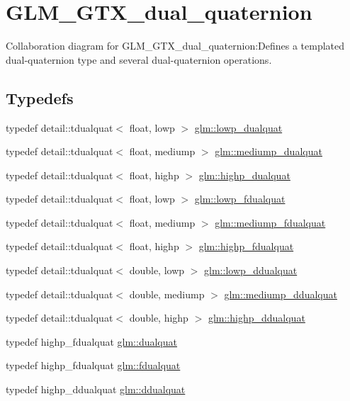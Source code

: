 \hypertarget{group__gtc__dual__quaternion}{
\section{GLM\_\-GTX\_\-dual\_\-quaternion}
\label{group__gtc__dual__quaternion}
}


Collaboration diagram for GLM\_\-GTX\_\-dual\_\-quaternion:Defines a templated dual-quaternion type and several dual-quaternion operations.  
\subsection*{Typedefs}
\begin{CompactItemize}
\item 
typedef detail::tdualquat$<$ float, lowp $>$ \hyperlink{group__gtc__dual__quaternion_ge1772179edc60f4e8b46c8772eeeccee}{glm::lowp\_\-dualquat}
\item 
typedef detail::tdualquat$<$ float, mediump $>$ \hyperlink{group__gtc__dual__quaternion_g71fc1c10a382330c1fee55ce29703405}{glm::mediump\_\-dualquat}
\item 
typedef detail::tdualquat$<$ float, highp $>$ \hyperlink{group__gtc__dual__quaternion_gf3a01deb502f53ca555ee1d45e6d6776}{glm::highp\_\-dualquat}
\item 
typedef detail::tdualquat$<$ float, lowp $>$ \hyperlink{group__gtc__dual__quaternion_ge62c636c63c9eb3c1ea6d10f4b7d7c81}{glm::lowp\_\-fdualquat}
\item 
typedef detail::tdualquat$<$ float, mediump $>$ \hyperlink{group__gtc__dual__quaternion_gb211d24786158490e57dfa57d7744f71}{glm::mediump\_\-fdualquat}
\item 
typedef detail::tdualquat$<$ float, highp $>$ \hyperlink{group__gtc__dual__quaternion_g2ed3283c09d3ffaf52a0e0a4b248eab6}{glm::highp\_\-fdualquat}
\item 
typedef detail::tdualquat$<$ double, lowp $>$ \hyperlink{group__gtc__dual__quaternion_g29461fddd543ffdf65a199fc28c42458}{glm::lowp\_\-ddualquat}
\item 
typedef detail::tdualquat$<$ double, mediump $>$ \hyperlink{group__gtc__dual__quaternion_g62d8cbf30e2afd0b1044204268a69066}{glm::mediump\_\-ddualquat}
\item 
typedef detail::tdualquat$<$ double, highp $>$ \hyperlink{group__gtc__dual__quaternion_g61b654c21f080135aedcf23461eb1037}{glm::highp\_\-ddualquat}
\item 
typedef highp\_\-fdualquat \hyperlink{group__gtc__dual__quaternion_g2f6227b5f9dc08a2e7682065a84b3aa9}{glm::dualquat}
\item 
typedef highp\_\-fdualquat \hyperlink{group__gtc__dual__quaternion_g436906129bc69ca5059555cafcbac9fd}{glm::fdualquat}
\item 
typedef highp\_\-ddualquat \hyperlink{group__gtc__dual__quaternion_g373431ffdd82d5c03c258217a9e1f1a6}{glm::ddualquat}
\end{CompactItemize}
